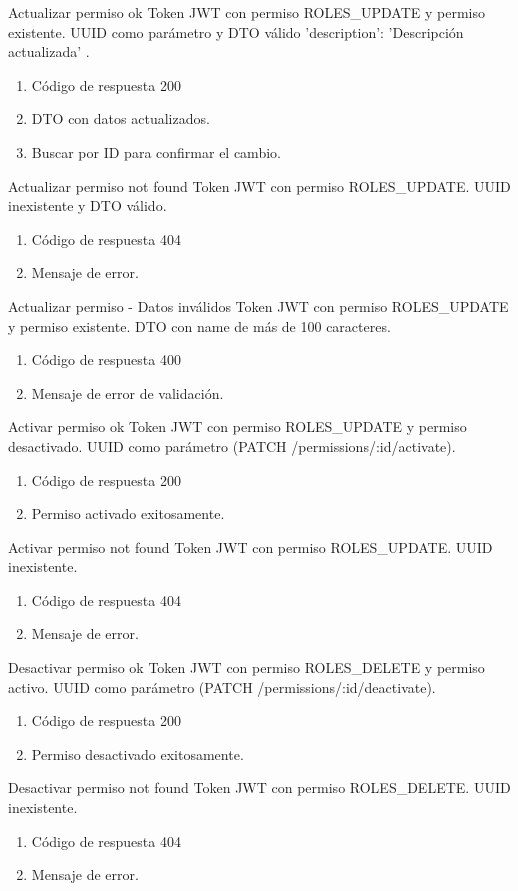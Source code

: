 {Actualizar permiso ok}
{Token JWT con permiso ROLES\_UPDATE y permiso existente.}
{UUID como parámetro y DTO válido { 'description': 'Descripción actualizada' }.}
{\begin{enumerate} [leftmargin=*, nosep]
    \item Código de respuesta 200
    \item DTO con datos actualizados.
    \item Buscar por ID para confirmar el cambio.
\end{enumerate}}

{Actualizar permiso not found}
{Token JWT con permiso ROLES\_UPDATE.}
{UUID inexistente y DTO válido.}
{\begin{enumerate} [leftmargin=*, nosep]
    \item Código de respuesta 404
    \item Mensaje de error.
\end{enumerate}}

{Actualizar permiso - Datos inválidos}
{Token JWT con permiso ROLES\_UPDATE y permiso existente.}
{DTO con name de más de 100 caracteres.}
{\begin{enumerate} [leftmargin=*, nosep]
    \item Código de respuesta 400
    \item Mensaje de error de validación.
\end{enumerate}}

{Activar permiso ok}
{Token JWT con permiso ROLES\_UPDATE y permiso desactivado.}
{UUID como parámetro (PATCH /permissions/:id/activate).}
{\begin{enumerate} [leftmargin=*, nosep]
    \item Código de respuesta 200
    \item Permiso activado exitosamente.
\end{enumerate}}

{Activar permiso not found}
{Token JWT con permiso ROLES\_UPDATE.}
{UUID inexistente.}
{\begin{enumerate} [leftmargin=*, nosep]
    \item Código de respuesta 404
    \item Mensaje de error.
\end{enumerate}}

{Desactivar permiso ok}
{Token JWT con permiso ROLES\_DELETE y permiso activo.}
{UUID como parámetro (PATCH /permissions/:id/deactivate).}
{\begin{enumerate} [leftmargin=*, nosep]
    \item Código de respuesta 200
    \item Permiso desactivado exitosamente.
\end{enumerate}}

{Desactivar permiso not found}
{Token JWT con permiso ROLES\_DELETE.}
{UUID inexistente.}
{\begin{enumerate} [leftmargin=*, nosep]
    \item Código de respuesta 404
    \item Mensaje de error.
\end{enumerate}}

